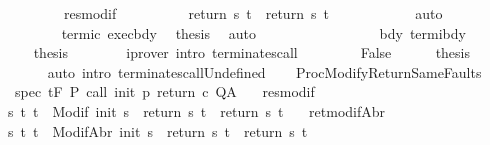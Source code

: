 \begin{isabellebody}
\ \ \ \ \ \ \ \ \ \ res{\isacharunderscore}modif\isanewline
\ \ \ \ \ \ \ \ \isamarkupfalse%
\ {\isachardoublequoteopen}return{\isacharprime}\ s\ t\ {\isacharequal}\ return\ s\ t{\isachardoublequoteclose}\isanewline
\ \ \ \ \ \ \ \ \ \ \isamarkupfalse%
\ auto\isanewline
\ \ \ \ \ \ \ \ \isamarkupfalse%
\ termi{\isacharunderscore}c\ exec{\isacharunderscore}bdy\ \isamarkupfalse%
\ {\isacharquery}thesis\ \isamarkupfalse%
\ auto\isanewline
\ \ \ \ \ \ \isamarkupfalse%
\isanewline
\ \ \ \ \isacommand{{\isacharbraceright}}\isamarkupfalse%
\isanewline
\ \ \ \ \isamarkupfalse%
\ bdy\ termi{\isacharunderscore}bdy\isanewline
\ \ \ \ \isamarkupfalse%
\ {\isacharquery}thesis\isanewline
\ \ \ \ \ \ \isamarkupfalse%
\ {\isacharparenleft}iprover\ intro{\isacharcolon}\ terminates{\isacharunderscore}call{\isacharparenright}\isanewline
\ \ \isamarkupfalse%
\isanewline
\ \ \ \ \isamarkupfalse%
\ False\isanewline
\ \ \ \ \isamarkupfalse%
\ {\isacharquery}thesis\isanewline
\ \ \ \ \ \ \isamarkupfalse%
\ {\isacharparenleft}auto\ intro{\isacharcolon}\ terminates{\isacharunderscore}callUndefined{\isacharparenright}\isanewline
\ \ \isamarkupfalse%
\isanewline
{}\isamarkupfalse%
%
\endisatagproof
{\isafoldproof}%
%
\isadelimproof
\isanewline
%
\endisadelimproof
\isanewline
{}\isamarkupfalse%
\ ProcModifyReturnSameFaults{\isacharcolon}\isanewline
\ \ \ spec{\isacharcolon}\ {\isachardoublequoteopen}{\isasymGamma}{\isacharcomma}{\isasymTheta}{\isasymturnstile}\isactrlsub t\isactrlbsub {\isacharslash}F\isactrlesub \ P\ {\isacharparenleft}call\ init\ p\ return{\isacharprime}\ c{\isacharparenright}\ Q{\isacharcomma}A{\isachardoublequoteclose}\isanewline
\ \ \ res{\isacharunderscore}modif{\isacharcolon}\isanewline
\ \ {\isachardoublequoteopen}{\isasymforall}s\ t{\isachardot}\ t\ {\isasymin}\ Modif\ {\isacharparenleft}init\ s{\isacharparenright}\ {\isasymlongrightarrow}\ {\isacharparenleft}return{\isacharprime}\ s\ t{\isacharparenright}\ {\isacharequal}\ {\isacharparenleft}return\ s\ t{\isacharparenright}{\isachardoublequoteclose}\isanewline
\ \ \ ret{\isacharunderscore}modifAbr{\isacharcolon}\ \isanewline
\ \ {\isachardoublequoteopen}{\isasymforall}s\ t{\isachardot}\ t\ {\isasymin}\ ModifAbr\ {\isacharparenleft}init\ s{\isacharparenright}\ {\isasymlongrightarrow}\ {\isacharparenleft}return{\isacharprime}\ s\ t{\isacharparenright}\ {\isacharequal}\ {\isacharparenleft}return\ s\ t{\isacharparenright}{\isachardoublequoteclose}\isanewline

\end{isabellebody}
